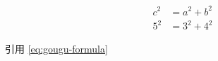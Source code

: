 \documentclass[12pt, a4paper, oneside, UTF8]{ctexbook}
\begin{document}
% 
\else
\fi
 
\begin{align}
    c^2 &= a^2 + b^2
    \label{eq:gougu-formula} \\
    5^2 &= 3^2 + 4^2
    \end{align}

引用 \ref{eq:gougu-formula}

\ifx\allfiles\undefined
\end{document}

